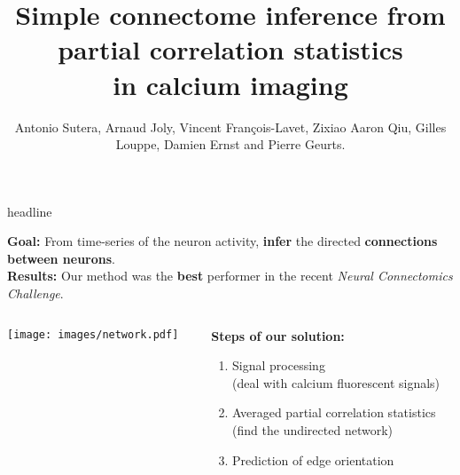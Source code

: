 \documentclass[final]{beamer}
\title{Simple connectome inference from partial correlation statistics\\in calcium imaging}
\author{{\footnotesize Antonio Sutera, Arnaud Joly, Vincent François-Lavet, Zixiao Aaron Qiu, Gilles Louppe, Damien Ernst and Pierre Geurts.}}
\date{}
\begin{document}

\begin{frame}

  \begin{beamercolorbox}[wd=\paperwidth, ignorebg]{headline}
    \begin{center}
      
    \end{center}
  \end{beamercolorbox}

\textbf{{\color{i6blue}Goal:}} From time-series of the neuron activity, \textbf{infer} the directed \textbf{connections between neurons}.\\[1ex]
\textbf{{\color{i6blue}Results:}} Our method was the \textbf{best} performer in the recent \textit{Neural Connectomics Challenge}.\\[1ex]

\begin{columns}
\begin{column}{0.55\linewidth}
\texttt{[image: images/network.pdf]}
\end{column}
\begin{column}{0.5\linewidth}

\textbf{{\color{green} Steps of our solution:}}
\begin{enumerate}
\item Signal processing\\{\scriptsize(deal with calcium fluorescent signals)}
\item Averaged partial correlation statistics\\{\scriptsize(find the undirected network)}
\item Prediction of edge orientation
\end{enumerate}


\end{column}
\end{columns}


\end{frame}
\end{document}
